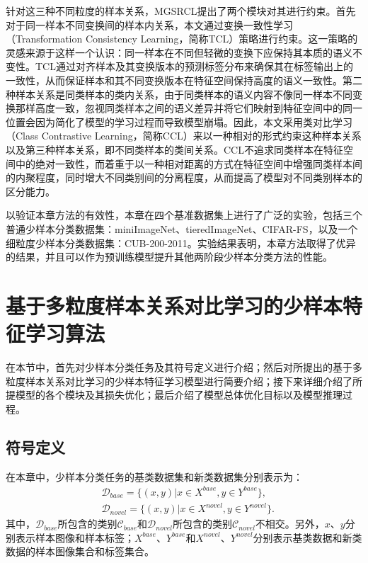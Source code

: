 针对这三种不同粒度的样本关系，MGSRCL提出了两个模块对其进行约束。首先对于同一样本不同变换间的样本内关系，本文通过变换一致性学习（Transformation Consistency Learning，简称TCL）策略进行约束。这一策略的灵感来源于这样一个认识：同一样本在不同但轻微的变换下应保持其本质的语义不变性。TCL通过对齐样本及其变换版本的预测标签分布来确保其在标签输出上的一致性，从而保证样本和其不同变换版本在特征空间保持高度的语义一致性。第二种样本关系是同类样本的类内关系，由于同类样本的语义内容不像同一样本不同变换那样高度一致，忽视同类样本之间的语义差异并将它们映射到特征空间中的同一位置会因为简化了模型的学习过程而导致模型崩塌。因此，本文采用类对比学习（Class Contrastive Learning，简称CCL）来以一种相对的形式约束这种样本关系以及第三种样本关系，即不同类样本的类间关系。CCL不追求同类样本在特征空间中的绝对一致性，而着重于以一种相对距离的方式在特征空间中增强同类样本间的内聚程度，同时增大不同类别间的分离程度，从而提高了模型对不同类别样本的区分能力。

以验证本章方法的有效性，本章在四个基准数据集上进行了广泛的实验，包括三个普通少样本分类数据集：miniImageNet\cite{vinyals2016matching}、tieredImageNet\cite{ren2018meta}、CIFAR-FS\cite{bertinetto2018meta}，以及一个细粒度少样本分类数据集：CUB-200-2011\cite{wah2011caltech}。实验结果表明，本章方法取得了优异的结果，并且可以作为预训练模型提升其他两阶段少样本分类方法的性能。


\section[\hspace{-2pt}基于多粒度样本关系对比学习的少样本特征学习算法]{{\heiti{} \hspace{-8pt}基于多粒度样本关系对比学习的少样本特征学习算法}}\label{section3: 基于多粒度样本关系对比学习的少样本特征学习算法}

在本节中，首先对少样本分类任务及其符号定义进行介绍；然后对所提出的基于多粒度样本关系对比学习的少样本特征学习模型进行简要介绍；接下来详细介绍了所提模型的各个模块及其损失优化；最后介绍了模型总体优化目标以及模型推理过程。

\subsection[\hspace{-2pt}符号定义]{{\heiti{} \hspace{-8pt}符号定义}}\label{section3: 符号定义}

在本章中，少样本分类任务的基类数据集和新类数据集分别表示为：
\begin{equation}
\begin{aligned}
  &\mathcal{D}_{base} = \{(x, y)|x \in X^{base}, y \in Y^{base}\}, \\
  &\mathcal{D}_{novel} = \{(x, y)|x \in X^{novel}, y \in Y^{novel}\}.
\end{aligned}
\end{equation}
其中，$\mathcal{D}_{base}$所包含的类别$\mathcal{C}_{base}$和$\mathcal{D}_{novel}$所包含的类别$\mathcal{C}_{novel}$不相交。另外，$x$、$y$分别表示样本图像和样本标签；$X^{base}$、$Y^{base}$和$X^{novel}$、$Y^{novel}$分别表示基类数据和新类数据的样本图像集合和标签集合。

